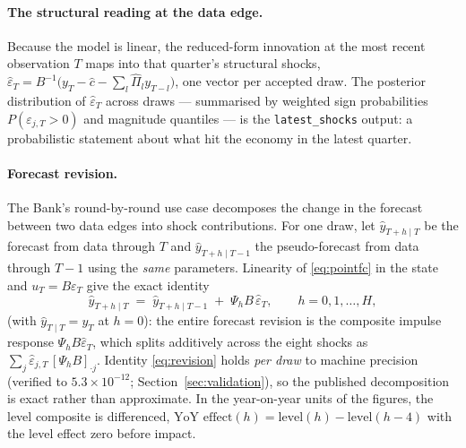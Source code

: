 \paragraph{The structural reading at the data edge.} Because the model is linear, the reduced-form innovation at the most recent observation $T$ maps into that quarter's structural shocks, $\hat{\varepsilon}_T = B^{-1}\big(y_T - \hat{c} - \textstyle\sum_l \hat{\Pi}_l y_{T-l}\big)$, one vector per accepted draw. The posterior distribution of $\hat{\varepsilon}_T$ across draws --- summarised by weighted sign probabilities $P(\varepsilon_{j,T} > 0)$ and magnitude quantiles --- is the \texttt{latest\_shocks} output: a probabilistic statement about what hit the economy in the latest quarter.

\paragraph{Forecast revision.} The Bank's round-by-round use case \citep{brignone2025, brignone2026} decomposes the change in the forecast between two data edges into shock contributions. For one draw, let $\hat{y}_{T+h \mid T}$ be the forecast from data through $T$ and $\hat{y}_{T+h \mid T-1}$ the pseudo-forecast from data through $T-1$ using the \emph{same} parameters. Linearity of \eqref{eq:pointfc} in the state and $u_T = B \varepsilon_T$ give the exact identity
\begin{equation}
\hat{y}_{T+h \mid T} \;=\; \hat{y}_{T+h \mid T-1} \;+\; \Psi_h B\, \hat{\varepsilon}_T ,
\qquad h = 0, 1, \ldots, H,
\label{eq:revision}
\end{equation}
(with $\hat{y}_{T \mid T} = y_T$ at $h=0$): the entire forecast revision is the composite impulse response $\Psi_h B \hat{\varepsilon}_T$, which splits additively across the eight shocks as $\sum_j \hat{\varepsilon}_{j,T}\, [\Psi_h B]_{\cdot j}$. Identity \eqref{eq:revision} holds \emph{per draw} to machine precision (verified to $5.3\times 10^{-12}$; Section~\ref{sec:validation}), so the published decomposition is exact rather than approximate. In the year-on-year units of the figures, the level composite is differenced, $\text{YoY effect}(h) = \text{level}(h) - \text{level}(h-4)$ with the level effect zero before impact.


